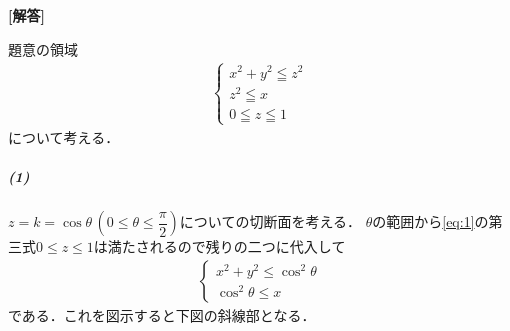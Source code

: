 \documentclass[../../main.tex]{subfiles}
\begin{document}
\begin{oframed}
  
\end{oframed}

{\bf [解答]}

題意の領域
\begin{align}
  \begin{cases}
    x^2+y^2 \leqq z^2 \\
    z^2 \leqq x \\
    0 \leqq z \leqq 1
  \end{cases} \label{eq:1}
\end{align}
について考える．

\subparagraph{(1)}

$z=k=\cos\theta\, \left(0 \le \theta \le \dfrac{\pi}{2}\right)$についての切断面を考える．
$\theta$の範囲から\cref{eq:1}の第三式$0 \le z \le 1$は満たされるので残りの二つに代入して
\begin{align}
  \begin{cases}
    x^2+y^2\le \cos^2\theta \\
    \cos^2\theta \le x
  \end{cases} \label{eq:2}
\end{align}
である．これを図示すると下図の斜線部となる．
\end{document}
